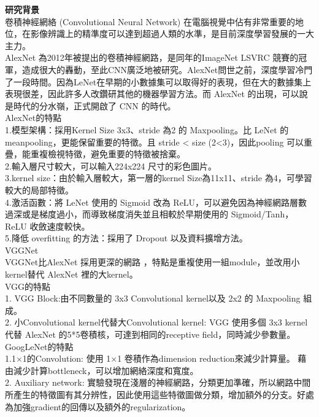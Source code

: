 \begin{flushleft}
  {\fontsize{12}{0} \bf 研究背景}
  \\\hspace{2em}
  卷積神經網絡 (Convolutional Neural Network) 在電腦視覺中佔有非常重要的地位，在影像辨識上的精準度可以達到超過人類的水準，是目前深度學習發展的一大主力。
  \\AlexNet \cite{AlexNet} 為2012年被提出的卷積神經網路，是同年的ImageNet LSVRC 競賽的冠軍，造成很大的轟動，至此CNN廣泛地被研究。AlexNet問世之前，深度學習冷門了一段時間。因為LeNet在早期的小數據集可以取得好的表現，但在大的數據集上表現很差，因此許多人改鑽研其他的機器學習方法。而 AlexNet 的出現，可以說是時代的分水嶺，正式開啟了 CNN 的時代。
  \\AlexNet的特點
  \\1.模型架構：採用Kernel Size 3x3、stride 為2 的 Maxpooling。比 LeNet 的meanpooling，更能保留重要的特徵。且 stride < size (2<3)，因此pooling 可以重疊，能重複檢視特徵，避免重要的特徵被捨棄。
  \\2.輸入層尺寸較大，可以輸入224x224 尺寸的彩色圖片。
  \\3.kernel size：由於輸入層較大，第一層的kernel Size為11x11、stride 為4，可學習較大的局部特徵。
  \\4.激活函數：將 LeNet 使用的 Sigmoid 改為 ReLU，可以避免因為神經網路層數過深或是梯度過小，而導致梯度消失並且相較於早期使用的 Sigmoid/Tanh，ReLU 收斂速度較快。
  \\5.降低 overfitting 的方法：採用了 Dropout 以及資料擴增方法。
  \\VGGNet
  \\\hspace{2em}
  VGGNet比AlexNet 採用更深的網路 \cite{vgg}，特點是重複使用一組module，並改用小kernel替代 AlexNet 裡的大kernel。
  \\VGG的特點
  \\1. VGG Block:由不同數量的 3x3 Convolutional kernel以及 2x2 的 Maxpooling 組成。
  \\2. 小Convolutional kernel代替大Convolutional kernel:
  VGG 使用多個 3x3 kernel代替 AlexNet 的5*5卷積核，可達到相同的receptive field，同時減少參數量。
  \\GoogLeNet的特點 \cite{GoogLeNet}
  \\1.1×1的Convolution: 使用 1×1 卷積作為dimension reduction來減少計算量。 藉由減少計算bottleneck，可以增加網絡深度和寬度。
  \\2. Auxiliary network: 實驗發現在淺層的神經網路，分類更加準確，所以網路中間所產生的特徵圖有其分辨性，因此使用這些特徵圖做分類，增加額外的分支。好處為加強gradient的回傳以及額外的regularization。

\end{flushleft}
